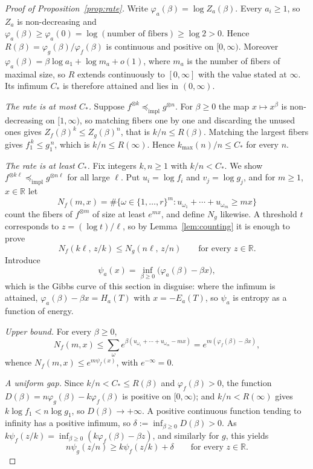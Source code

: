 \documentclass[11pt]{article}
\theoremstyle{definition}
\theoremstyle{remark}
\newcommand{\impl}{\preccurlyeq_{\mathrm{impl}}}
\begin{document}
\begin{proof}[Proof of Proposition~\ref{prop:rate}]
Write \(\varphi_a(\beta)=\log Z_a(\beta)\).  Every \(a_i\geq1\), so \(Z_a\) is
non-decreasing and \(\varphi_a(\beta)\geq\varphi_a(0)=\log(\text{number of
fibers})\geq\log2>0\).  Hence \(R(\beta)=\varphi_g(\beta)/\varphi_f(\beta)\)
is continuous and positive on \([0,\infty)\).  Moreover
\(\varphi_a(\beta)=\beta\log a_1+\log m_a+o(1)\), where \(m_a\) is the number
of fibers of maximal size, so \(R\) extends continuously to \([0,\infty]\)
with the value stated at \(\infty\).  Its infimum \(C_*\) is therefore
attained and lies in \((0,\infty)\).

\emph{The rate is at most \(C_*\).}  Suppose \(f^{\otimes k}\impl g^{\otimes
n}\).  For \(\beta\geq0\) the map \(x\mapsto x^\beta\) is non-decreasing on
\([1,\infty)\), so matching fibers one by one and discarding the unused ones
gives \(Z_f(\beta)^k\leq Z_g(\beta)^n\), that is \(k/n\leq R(\beta)\).
Matching the largest fibers gives \(f_1^{\,k}\leq g_1^{\,n}\), which is
\(k/n\leq R(\infty)\).  Hence \(k_{\max}(n)/n\leq C_*\) for every \(n\).

\emph{The rate is at least \(C_*\).}  Fix integers \(k,n\geq1\) with
\(k/n<C_*\).  We show \(f^{\otimes k\ell}\impl g^{\otimes n\ell}\) for all
large \(\ell\).  Put \(u_i=\log f_i\) and \(v_j=\log g_j\), and for
\(m\geq1\), \(x\in\mathbb R\) let
\[
  N_f(m,x)=\#\bigl\{\omega\in\{1,\ldots,r\}^m:
    u_{\omega_1}+\cdots+u_{\omega_m}\geq mx\bigr\}
\]
count the fibers of \(f^{\otimes m}\) of size at least \(e^{mx}\), and define
\(N_g\) likewise.  A threshold \(t\) corresponds to \(z=(\log t)/\ell\), so by
Lemma~\ref{lem:counting} it is enough to prove
\begin{equation}
  \label{eq:counting-goal}
  N_f(k\ell,\,z/k)\leq N_g(n\ell,\,z/n)
  \qquad\text{for every }z\in\mathbb R .
\end{equation}
Introduce
\[
  \psi_a(x)=\inf_{\beta\geq0}\bigl(\varphi_a(\beta)-\beta x\bigr),
\]
which is the Gibbs curve of this section in disguise: where the infimum is
attained, \(\varphi_a(\beta)-\beta x=H_a(T)\) with \(x=-E_a(T)\), so
\(\psi_a\) is entropy as a function of energy.

\emph{Upper bound.}  For every \(\beta\geq0\),
\[
  N_f(m,x)
  \leq\sum_\omega e^{\beta(u_{\omega_1}+\cdots+u_{\omega_m}-mx)}
  =e^{m(\varphi_f(\beta)-\beta x)},
\]
whence \(N_f(m,x)\leq e^{m\psi_f(x)}\), with \(e^{-\infty}=0\).

\emph{A uniform gap.}  Since \(k/n<C_*\leq R(\beta)\) and
\(\varphi_f(\beta)>0\), the function
\(D(\beta)=n\varphi_g(\beta)-k\varphi_f(\beta)\) is positive on
\([0,\infty)\); and \(k/n<R(\infty)\) gives \(k\log f_1<n\log g_1\), so
\(D(\beta)\to+\infty\).  A positive continuous function tending to infinity
has a positive infimum, so \(\delta:=\inf_{\beta\geq0}D(\beta)>0\).  As
\(k\psi_f(z/k)=\inf_{\beta\geq0}(k\varphi_f(\beta)-\beta z)\), and similarly
for \(g\), this yields
\begin{equation}
  \label{eq:psi-gap}
  n\psi_g(z/n)\geq k\psi_f(z/k)+\delta
  \qquad\text{for every }z\in\mathbb R .
\end{equation}


\end{proof}
\end{document}
